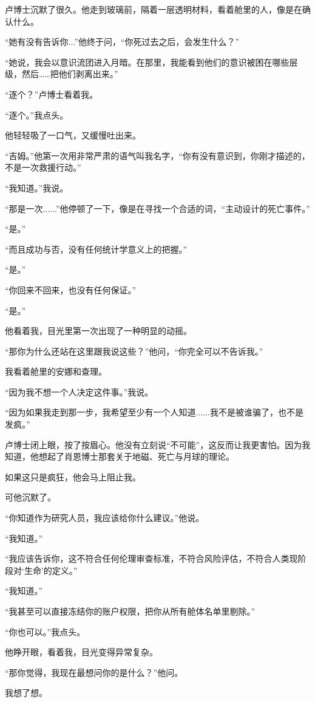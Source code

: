 卢博士沉默了很久。他走到玻璃前，隔着一层透明材料，看着舱里的人，像是在确认什么。

“她有没有告诉你...”他终于问，“你死过去之后，会发生什么？”

“她说，我会以意识流团进入月暗。在那里，我能看到他们的意识被困在哪些层级，然后……把他们剥离出来。”

“逐个？”卢博士看着我。

“逐个。”我点头。

他轻轻吸了一口气，又缓慢吐出来。

“吉姆。”他第一次用非常严肃的语气叫我名字，“你有没有意识到，你刚才描述的，不是一次救援行动。”

“我知道。”我说。

“那是一次......”他停顿了一下，像是在寻找一个合适的词，“主动设计的死亡事件。”

“是。”

“而且成功与否，没有任何统计学意义上的把握。”

“是。”

“你回来不回来，也没有任何保证。”

“是。”

他看着我，目光里第一次出现了一种明显的动摇。

“那你为什么还站在这里跟我说这些？”他问，“你完全可以不告诉我。”

我看着舱里的安娜和查理。

“因为我不想一个人决定这件事。”我说。

“因为如果我走到那一步，我希望至少有一个人知道......我不是被谁骗了，也不是发疯。”

卢博士闭上眼，按了按眉心。他没有立刻说“不可能”，这反而让我更害怕。因为我知道，他想起了肖恩博士那套关于地磁、死亡与月球的理论。

如果这只是疯狂，他会马上阻止我。

可他沉默了。

“你知道作为研究人员，我应该给你什么建议。”他说。

“我知道。”

“我应该告诉你，这不符合任何伦理审查标准，不符合风险评估，不符合人类现阶段对‘生命’的定义。”

“我知道。”

“我甚至可以直接冻结你的账户权限，把你从所有舱体名单里剔除。”

“你也可以。”我点头。

他睁开眼，看着我，目光变得异常复杂。

“那你觉得，我现在最想问你的是什么？”他问。

我想了想。

